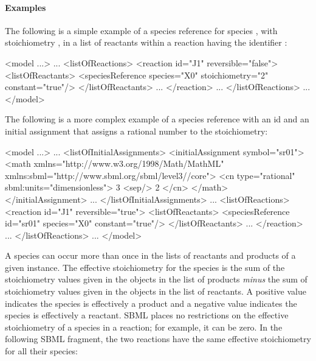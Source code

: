 \paragraph{Examples}

The following is a simple example of a species reference for
species , with stoichiometry , in a list of
reactants within a reaction having the identifier :

\begin{example}
<model ...>
    ...
    <listOfReactions>
        <reaction id="J1" reversible="false">
            <listOfReactants>
                <speciesReference species="X0" stoichiometry="2" constant="true"/>
            </listOfReactants>
            ...
        </reaction>
        ...
    </listOfReactions>
    ...
</model>
\end{example}

The following is a more complex example of a species reference
with an id  and an initial assignment that assigns a
rational number to the stoichiometry:

\begin{example}
<model ...>
    ...
    <listOfInitialAssignments>
        <initialAssignment symbol="sr01">
            <math xmlns="http://www.w3.org/1998/Math/MathML"
                  xmlns:sbml="http://www.sbml.org/sbml/level3/\thisvlc/core">
                <cn type="rational" sbml:units="dimensionless"> 3 <sep/> 2 </cn>
            </math>
        </initialAssignment>
        ...
    </listOfInitialAssignments>
        ...
    <listOfReactions>
        <reaction id="J1" reversible="true">
            <listOfReactants>
                <speciesReference id="sr01" species="X0" constant="true"/>
            </listOfReactants>
            ...
        </reaction>
        ...
    </listOfReactions>
    ...
</model>
\end{example}


A species can occur more than once in the lists of reactants and
products of a given \Reaction instance.  The effective
stoichiometry for the species is the sum of the stoichiometry
values given in the \SpeciesReference objects in the list of
products \emph{minus} the sum of stoichiometry values given in the
\SpeciesReference objects in the list of reactants.  A positive
value indicates the species is effectively a product and a
negative value indicates the species is effectively a reactant.
SBML places no restrictions on the effective stoichiometry of a
species in a reaction; for example, it can be zero.  In the
following SBML fragment, the two reactions have the same effective
stoichiometry for all their species:

